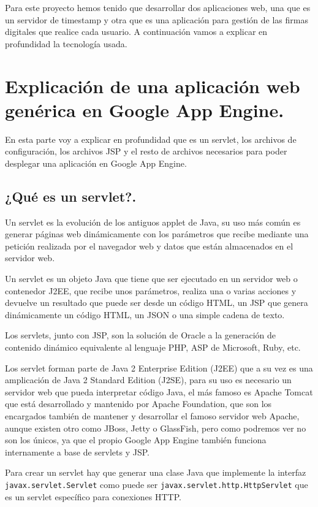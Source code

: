 Para este proyecto hemos tenido que desarrollar dos aplicaciones web, una que es un servidor de timestamp y otra que es una aplicación para gestión de las firmas digitales que realice cada usuario. A continuación vamos a explicar en profundidad la tecnología usada.

\section[Aplicación web genérica en GAE]{Explicación de una aplicación web genérica en Google App Engine.}
En esta parte voy a explicar en profundidad que es un servlet, los archivos de configuración, los archivos JSP y el resto de archivos necesarios para poder desplegar una aplicación en Google App Engine.
 
\subsection{¿Qué es un servlet?.}
Un servlet es la evolución de los antiguos applet de Java, su uso más común es generar páginas web dinámicamente con los parámetros que recibe mediante una petición realizada por el navegador web y datos que están almacenados en el servidor web.

Un servlet es un objeto Java que tiene que ser ejecutado en un servidor web o contenedor J2EE, que recibe unos parámetros, realiza una o varias acciones y devuelve un resultado que puede ser desde un código HTML, un JSP que genera dinámicamente un código HTML, un JSON o una simple cadena de texto.

Los servlets, junto con JSP, son la solución de Oracle a la generación de contenido dinámico equivalente al lenguaje PHP, ASP de Microsoft, Ruby, etc.

Los servlet forman parte de Java 2 Enterprise Edition (J2EE) que a su vez es una amplicación de Java 2 Standard Edition (J2SE), para su uso es necesario un servidor web que pueda interpretar código Java, el más famoso es Apache Tomcat que está desarrollado y mantenido por Apache Foundation, que son los encargados también de mantener y desarrollar el famoso servidor web Apache, aunque existen otro como JBoss, Jetty o GlassFish, pero como podremos ver no son los únicos, ya que el propio Google App Engine también funciona internamente a base de servlets y JSP.

Para crear un servlet hay que generar una clase Java que implemente la interfaz \lstinline{javax.servlet.Servlet} como puede ser \lstinline{javax.servlet.http.HttpServlet} que es un servlet específico para conexiones HTTP.
 
